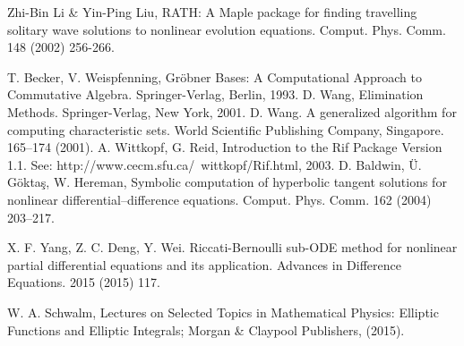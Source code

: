 \documentclass[prd,aps,floats,showkeys,nofootinbib,notitlepage]{revtex4}
\begin{document}
\begin{thebibliography}{00}
		 Zhi-Bin Li \& Yin-Ping Liu, RATH: A Maple package for finding travelling solitary wave solutions to nonlinear evolution equations. Comput. Phys. Comm. {148} (2002) 256-266.
		
		 T. Becker, V. Weispfenning, Gr\"obner Bases: A Computational Approach to Commutative Algebra. Springer-Verlag, Berlin, 1993.
		 D. Wang, Elimination Methods. Springer-Verlag, New York, 2001.
		 D. Wang. A generalized algorithm for computing characteristic sets. World Scientific Publishing Company, Singapore. 165–174 (2001). 
		 A. Wittkopf, G. Reid, Introduction to the Rif Package Version 1.1. See: http://www.cecm.sfu.ca/~wittkopf/Rif.html, 2003.
		 D. Baldwin, \"U. G\"okta\c{s}, W. Hereman, Symbolic computation of hyperbolic tangent solutions for nonlinear differential–difference equations. Comput. Phys. Comm. 162 (2004) 203–217.
		
		
		 X. F. Yang, Z. C. Deng, Y. Wei. Riccati-Bernoulli sub-ODE method for nonlinear partial differential equations and its application. Advances in Difference Equations. 2015 (2015) 117.
		 
		W. A. Schwalm, Lectures on Selected Topics in Mathematical Physics: Elliptic Functions and Elliptic Integrals; Morgan \& Claypool Publishers, (2015).

		
		
		
		
	
		
	\end{thebibliography}
	
\end{document}
